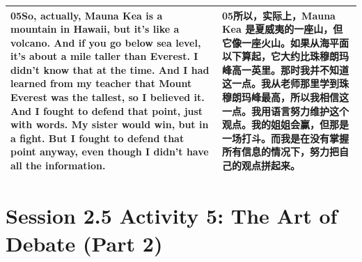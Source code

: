 \documentclass[UTF8,zihao=-4,fontset=fandol]{ctexart}
\newcommand{\TranscriptColumn}{\raggedright\arraybackslash\hyphenpenalty=10000\exhyphenpenalty=10000\sloppy}
\begin{document}
\begin{longtable}{>{\TranscriptColumn}p{} >{\TranscriptColumn}p{}}
\textbf{05}\quad So, actually, Mauna Kea is a mountain in Hawaii, but it's like a volcano. And if you go below sea level, it's about a mile taller than Everest. I didn't know that at the time. And I had learned from my teacher that Mount Everest was the tallest, so I believed it. And I fought to defend that point, just with words. My sister would win, but in a fight. But I fought to defend that point anyway, even though I didn't have all the information. & \textbf{05}\quad 所以，实际上，Mauna Kea 是夏威夷的一座山，但它像一座火山。如果从海平面以下算起，它大约比珠穆朗玛峰高一英里。那时我并不知道这一点。我从老师那里学到珠穆朗玛峰最高，所以我相信这一点。我用语言努力维护这个观点。我的姐姐会赢，但那是一场打斗。而我是在没有掌握所有信息的情况下，努力把自己的观点拼起来。 \\ \hline
\end{longtable}


\clearpage
\section{Session 2.5 Activity 5: The Art of Debate (Part 2)}
\end{document}
